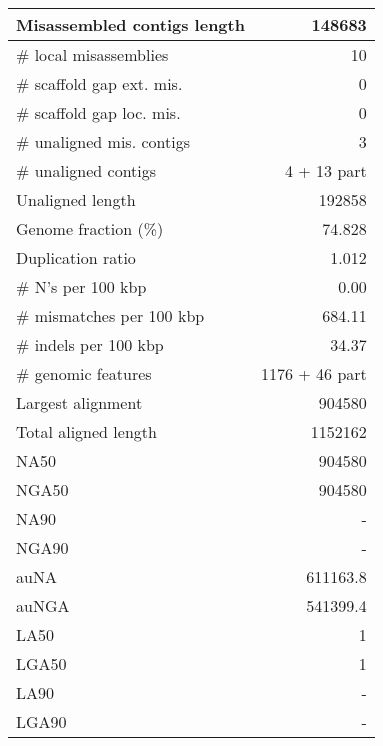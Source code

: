 \documentclass[12pt,a4paper]{article}
\begin{document}
\begin{table}[ht]
\begin{center}
\begin{tabular}{|l*{1}{|r}|}
Misassembled contigs length & 148683 \\ \hline
\# local misassemblies & 10 \\ \hline
\# scaffold gap ext. mis. & 0 \\ \hline
\# scaffold gap loc. mis. & 0 \\ \hline
\# unaligned mis. contigs & 3 \\ \hline
\# unaligned contigs & 4 + 13 part \\ \hline
Unaligned length & 192858 \\ \hline
Genome fraction (\%) & 74.828 \\ \hline
Duplication ratio & 1.012 \\ \hline
\# N's per 100 kbp & 0.00 \\ \hline
\# mismatches per 100 kbp & 684.11 \\ \hline
\# indels per 100 kbp & 34.37 \\ \hline
\# genomic features & 1176 + 46 part \\ \hline
Largest alignment & 904580 \\ \hline
Total aligned length & 1152162 \\ \hline
NA50 & 904580 \\ \hline
NGA50 & 904580 \\ \hline
NA90 & - \\ \hline
NGA90 & - \\ \hline
auNA & 611163.8 \\ \hline
auNGA & 541399.4 \\ \hline
LA50 & 1 \\ \hline
LGA50 & 1 \\ \hline
LA90 & - \\ \hline
LGA90 & - \\ \hline
\end{tabular}
\end{center}
\end{table}
\end{document}
